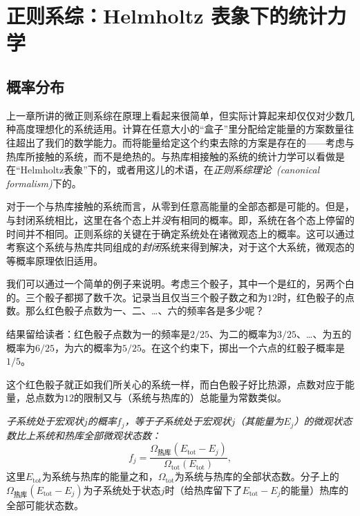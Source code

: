\chapter{正则系综：Helmholtz 表象下的统计力学}\label{chap16}
\section{概率分布}\label{sec16.1}
上一章所讲的微正则系综在原理上看起来很简单，但实际计算起来却仅仅对少数几种高度理想化的系统适用。计算在任意大小的“盒子”里分配给定能量的方案数量往往超出了我们的数学能力。而将能量给定这个约束去除的方案是存在的——考虑与热库所接触的系统，而不是绝热的。与热库相接触的系统的统计力学可以看做是在“Helmholtz表象”下的，或者用这儿的术语，在{\it 正则系综理论~(canonical formalism)}下的。

对于一个与热库接触的系统而言，从零到任意高能量的全部态都是可能的。但是，与封闭系统相比，这里在各个态上并{\it 没}有相同的概率。即，系统在各个态上停留的时间并不相同。正则系综的关键在于确定系统处在诸微观态上的概率。这可以通过考察这个系统与热库共同组成的{\it 封闭}系统来得到解决，对于这个大系统，微观态的等概率原理依旧适用。

我们可以通过一个简单的例子来说明。考虑三个骰子，其中一个是红的，另两个白的。三个骰子都掷了数千次。记录当且仅当三个骰子数之和为$12$时，红色骰子的点数。那么红色骰子点数为一、二、\dots 、六的频率各是多少呢？

结果留给读者：红色骰子点数为一的频率是$2/25$、为二的概率为$3/25$、\dots 、为五的概率为$6/25$，为六的概率为$5/25$。在这个约束下，掷出一个六点的红骰子概率是$1/5$。

这个红色骰子就正如我们所关心的系统一样，而白色骰子好比热源，点数对应于能量，总点数为$12$的限制又与（系统与热库的）总能量为常数类似。

{\it 子系统处于宏观状$j$的概率$f_j$，等于子系统处于宏观状$j$（其能量为$E_j$）的微观状态数比上系统和热库全部微观状态数：}
\begin{equation}
\label{equ16.1}
f_j = \frac{\Omega_\text{热库}(E_\text{tot}-E_j)}{\Omega_\text{tot}(E_\text{tot})},
\end{equation}
这里$E_\text{tot}$为系统与热库的能量之和，$\Omega_\text{tot}$为系统与热库的全部状态数。分子上的$\Omega_\text{热库}(E_\text{tot}-E_j)$为子系统处于状态$j$时（给热库留下了$E_\text{tot}-E_j$的能量）热库的全部可能状态数。

